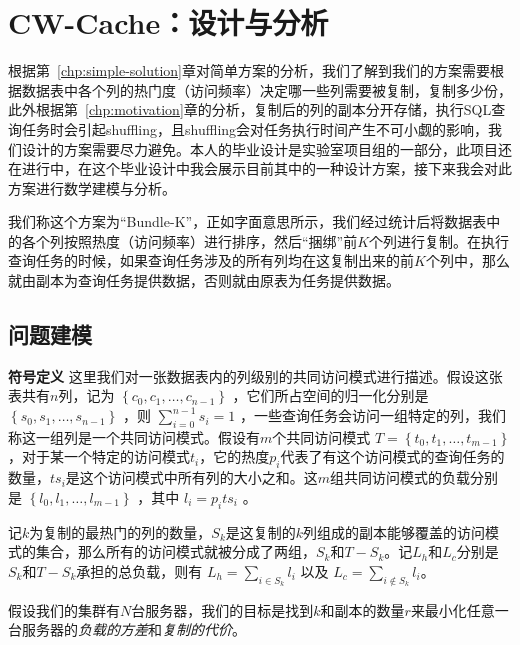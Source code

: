 \chapter{CW-Cache：设计与分析}
\label{chp:cw-cache}

\par 根据第~\ref{chp:simple-solution}章对简单方案的分析，我们了解到我们的方案需要根据数据表中各个列的热门度（访问频率）决定哪一些列需要被复制，复制多少份，此外根据第~\ref{chp:motivation}章的分析，复制后的列的副本分开存储，执行SQL查询任务时会引起shuffling，且shuffling会对任务执行时间产生不可小觑的影响，我们设计的方案需要尽力避免。本人的毕业设计是实验室项目组的一部分，此项目还在进行中，在这个毕业设计中我会展示目前其中的一种设计方案，接下来我会对此方案进行数学建模与分析。

\par 我们称这个方案为“Bundle-K”，正如字面意思所示，我们经过统计后将数据表中的各个列按照热度（访问频率）进行排序，然后“捆绑”前$K$个列进行复制。在执行查询任务的时候，如果查询任务涉及的所有列均在这复制出来的前$K$个列中，那么就由副本为查询任务提供数据，否则就由原表为任务提供数据。

\section{问题建模}
\label{sec:bundle-k-model}

\par \noindent \textbf{符号定义} \quad 这里我们对一张数据表内的列级别的共同访问模式进行描述。假设这张表共有$n$列，记为 $\left\{c_{0}, c_{1}, \dots, c_{n-1}\right\}$ ，它们所占空间的归一化分别是 $\left\{s_{0}, s_{1}, \dots, s_{n-1}\right\}$ ，则 $\sum_{i=0}^{n-1} s_i = 1$ ，一些查询任务会访问一组特定的列，我们称这一组列是一个共同访问模式。假设有$m$个共同访问模式 $T = \left\{t_{0}, t_{1}, \dots, t_{m-1}\right\}$ ，对于某一个特定的访问模式$t_i$，它的热度$p_i$代表了有这个访问模式的查询任务的数量，$ts_i$是这个访问模式中所有列的大小之和。这$m$组共同访问模式的负载分别是 $\left\{l_{0}, l_{1}, \dots, l_{m-1}\right\}$ ，其中 $l_i = p_i ts_i$ 。

\par 记$k$为复制的最热门的列的数量，$S_k$是这复制的$k$列组成的副本能够覆盖的访问模式的集合，那么所有的访问模式就被分成了两组，$S_k$和$T-S_k$。记$L_h$和$L_c$分别是$S_k$和$T-S_k$承担的总负载，则有 $L_h=\sum_{i \in S_{k}} l_{i}$ 以及 $ L_c = \sum_{i \notin S_{k}} l_{i}$。

\par 假设我们的集群有$N$台服务器，我们的目标是找到$k$和副本的数量$r$来最小化任意一台服务器的\emph{负载的方差}和\emph{复制的代价}。


